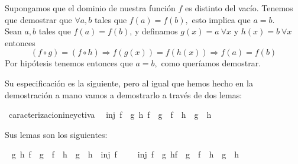 \begin{isabellebody}
\begin{isamarkuptext}
\begin {demostracion}


Supongamos que el dominio de nuestra función $f$ es distinto del vacío.
Tenemos que demostrar que $\forall a,b$ tales que $f(a) = f(b),$ esto
 implica que $a = b.$ \\
Sean $a,b$ tales que $f(a) = f(b)$, y definamos $g(x) = a  \ \forall x$
 y $h(x) = b \  \forall x$ entonces 
$$(f \circ g) = (f \circ h) \Longrightarrow  f(g(x)) = f(h(x)) \Longrightarrow f(a) = f(b)$$
Por hipótesis tenemos entonces que $a = b,$ como queríamos demostrar.
\end {demostracion}


  Su especificación es la siguiente, pero al igual que hemos hecho en la demostración
a mano vamos a demostrarlo a través de dos lemas:%
\end{isamarkuptext}\isamarkuptrue%
\isamarkupfalse%
\ caracterizacionineyctiva{\isacharcolon}\isanewline
\ \ {\isachardoublequoteopen}inj\ f\ {\isasymlongleftrightarrow}\ {\isacharparenleft}{\isasymforall}g\ h{\isachardot}\ {\isacharparenleft}f\ {\isasymcirc}\ g\ {\isacharequal}\ f\ {\isasymcirc}\ h{\isacharparenright}\ {\isasymlongrightarrow}\ {\isacharparenleft}g\ {\isacharequal}\ h{\isacharparenright}{\isacharparenright}{\isachardoublequoteclose}\isanewline
%
\isadelimproof
\ \ %
\endisadelimproof
%
\isatagproof
{}\isamarkupfalse%
%
\endisatagproof
{\isafoldproof}%
%
\isadelimproof
%
\endisadelimproof
%
\begin{isamarkuptext}%
Sus lemas son los siguientes:%
\end{isamarkuptext}\isamarkuptrue%
\isamarkupfalse%
\ \isanewline
{\isachardoublequoteopen}{\isasymforall}g\ h{\isachardot}\ {\isacharparenleft}f\ {\isasymcirc}\ g\ {\isacharequal}\ f\ {\isasymcirc}\ h\ {\isasymlongrightarrow}\ g\ {\isacharequal}\ h{\isacharparenright}\ {\isasymLongrightarrow}\ inj\ f{\isachardoublequoteclose}\isanewline
%
\isadelimproof
\ \ %
\endisadelimproof
%
\isatagproof
{}\isamarkupfalse%
%
\endisatagproof
{\isafoldproof}%
%
\isadelimproof
\isanewline
%
\endisadelimproof
\isanewline
{}\isamarkupfalse%
\ \isanewline
{\isachardoublequoteopen}inj\ f\ {\isasymLongrightarrow}\ {\isacharparenleft}{\isasymforall}g\ h{\isachardot}{\isacharparenleft}f\ {\isasymcirc}\ g\ {\isacharequal}\ f\ {\isasymcirc}\ h{\isacharparenright}\ {\isasymlongrightarrow}\ {\isacharparenleft}g\ {\isacharequal}\ h{\isacharparenright}{\isacharparenright}{\isachardoublequoteclose}\isanewline
%
\isadelimproof

\end{isabellebody}
